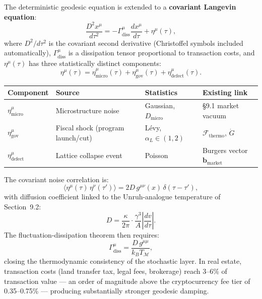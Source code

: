 \documentclass[12pt,a4paper]{article}
\begin{document}
The deterministic geodesic equation is extended to a \textbf{covariant
Langevin equation}:
\begin{equation}
    \frac{D^2 x^\mu}{d\tau^2}
    = -\Gamma^\mu_{\mathrm{diss}}\frac{dx^\mu}{d\tau}
    + \eta^\mu(\tau),
\end{equation}
where $D^2/d\tau^2$ is the covariant second derivative (Christoffel
symbols included automatically), $\Gamma^\mu_{\mathrm{diss}}$ is a
dissipation tensor proportional to transaction costs, and
$\eta^\mu(\tau)$ has three statistically distinct components:
\begin{equation}
    \eta^\mu(\tau)
    = \eta^\mu_{\mathrm{micro}}(\tau)
    + \eta^\mu_{\mathrm{gov}}(\tau)
    + \eta^\mu_{\mathrm{defect}}(\tau).
\end{equation}

\begin{center}
\begin{tabular}{p{2.6cm}p{3.6cm}p{2.4cm}p{3.0cm}}
\toprule
Component & Source & Statistics & Existing link \\
\midrule
$\eta^\mu_{\mathrm{micro}}$ & Microstructure noise &
  Gaussian, $D_{\mathrm{micro}}$ & \S9.1 market vacuum \\
$\eta^\mu_{\mathrm{gov}}$ & Fiscal shock (program launch/cut) &
  L\'evy, $\alpha_L \in (1,2)$ &
  $\mathcal{F}_{\mathrm{thermo}}$, $\dot{G}$ \\
$\eta^\mu_{\mathrm{defect}}$ & Lattice collapse event &
  Poisson & Burgers vector $\mathbf{b}_{\mathrm{market}}$ \\
\bottomrule
\end{tabular}
\end{center}

The covariant noise correlation is:
\begin{equation}
    \langle \eta^\mu(\tau)\,\eta^\nu(\tau') \rangle
    = 2D\,g^{\mu\nu}(x)\,\delta(\tau - \tau'),
\end{equation}
with diffusion coefficient linked to the Unruh-analogue temperature
of Section~9.2:
\begin{equation}
    D = \frac{\kappa}{2\pi}\cdot\frac{\gamma^3}{A}
    \left\lvert\frac{dv}{d\tau}\right\rvert.
\end{equation}
The fluctuation-dissipation theorem then requires:
\begin{equation}
    \Gamma^\mu_{\mathrm{diss}}
    = \frac{D\,g^{\mu\mu}}{k_B T_{\mathcal{M}}},
\end{equation}
closing the thermodynamic consistency of the stochastic layer.
In real estate, transaction costs (land transfer tax, legal fees,
brokerage) reach 3--6\% of transaction value --- an order of magnitude
above the cryptocurrency fee tier of 0.35--0.75\% --- producing
substantially stronger geodesic damping.
\end{document}
